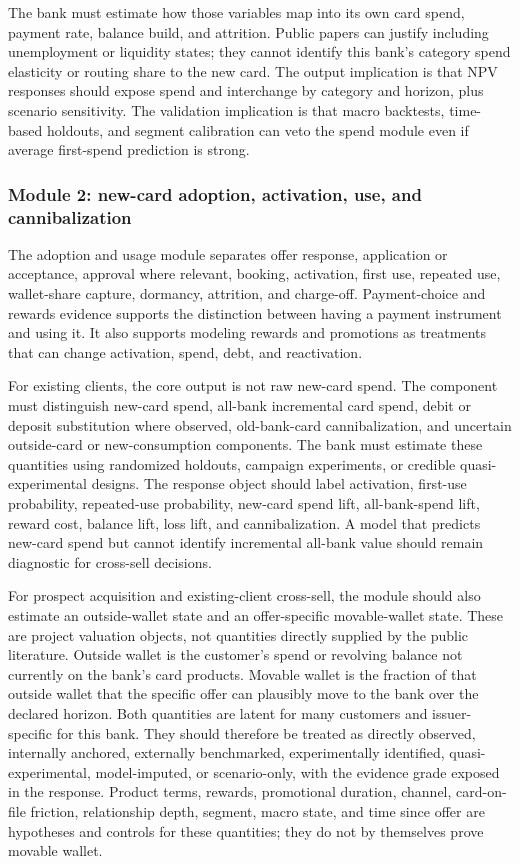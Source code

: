 \documentclass[11pt]{article}
\newcommand{\1}{\mathbf{1}}
\begin{document}
The bank must estimate how those variables map into its own card spend,
payment rate, balance build, and attrition. Public papers can justify including
unemployment or liquidity states; they cannot identify this bank's category
spend elasticity or routing share to the new card. The output implication is
that NPV responses should expose spend and interchange by category and horizon,
plus scenario sensitivity. The validation implication is that macro backtests,
time-based holdouts, and segment calibration can veto the spend module even if
average first-spend prediction is strong.

\subsubsection{Module 2: new-card adoption, activation, use, and cannibalization}
\label{subsec:module-adoption-use}

The adoption and usage module separates offer response, application or
acceptance, approval where relevant, booking, activation, first use, repeated
use, wallet-share capture, dormancy, attrition, and charge-off. Payment-choice
and rewards evidence supports the distinction between having a payment
instrument and using it. It also supports modeling rewards and promotions as
treatments that can change activation, spend, debt, and reactivation.

For existing clients, the core output is not raw new-card spend. The component
must distinguish new-card spend, all-bank incremental card spend, debit or
deposit substitution where observed, old-bank-card cannibalization, and
uncertain outside-card or new-consumption components. The bank must estimate
these quantities using randomized holdouts, campaign experiments, or credible
quasi-experimental designs. The response object should label activation,
first-use probability, repeated-use probability, new-card spend lift,
all-bank-spend lift, reward cost, balance lift, loss lift, and
cannibalization. A model that predicts new-card spend but cannot identify
incremental all-bank value should remain diagnostic for cross-sell decisions.

For prospect acquisition and existing-client cross-sell, the module should also
estimate an outside-wallet state and an offer-specific movable-wallet state.
These are project valuation objects, not quantities directly supplied by the
public literature. Outside wallet is the customer's spend or revolving balance
not currently on the bank's card products. Movable wallet is the fraction of
that outside wallet that the specific offer can plausibly move to the bank over
the declared horizon. Both quantities are latent for many customers and
issuer-specific for this bank. They should therefore be treated as directly
observed, internally anchored, externally benchmarked, experimentally
identified, quasi-experimental, model-imputed, or scenario-only, with the
evidence grade exposed in the response. Product terms, rewards, promotional
duration, channel, card-on-file friction, relationship depth, segment, macro
state, and time since offer are hypotheses and controls for these quantities;
they do not by themselves prove movable wallet.
\end{document}
